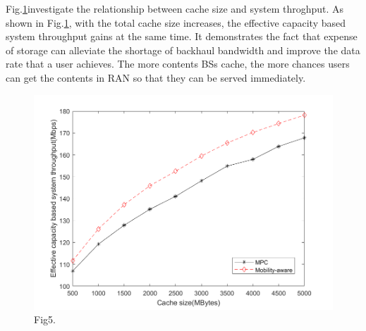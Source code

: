 \documentclass[conference]{IEEEtran}
\begin{document}
Fig.\ref{fig 5}investigate the relationship between cache size and system throghput. As shown in Fig.\ref{fig 5}, with the total cache size increases, the effective capacity based system throughput gains at the same time. It demonstrates the fact that expense of storage can alleviate the shortage of backhaul bandwidth and improve the data rate that a user achieves. The more contents BSs cache, the more chances users can get the contents in RAN so that they can be served immediately.
\begin{figure}[htbp]
 \centerline{\includegraphics[scale=0.3]{fig5.png}}
 \caption{Fig5.}
 \label{fig 5}
\end{figure}
\end{document}
